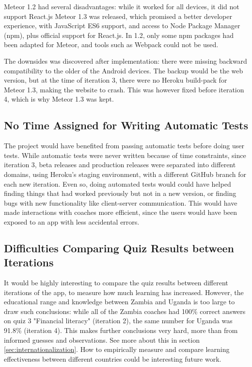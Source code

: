 Meteor 1.2 had several disadvantages: while it worked for all devices, it did not support React.js Meteor 1.3 was released, which promised a better developer experience, with JavaScript ES6 support, and access to Node Package Manager (npm), plus official support for React.js. In 1.2, only some npm packages had been adapted for Meteor, and tools such as Webpack could not be used.

The downsides was discovered after implementation: there were missing backward compatibility to the older of the Android devices. The backup would be the web version, but at the time of iteration 3, there were no Heroku build-pack for Meteor 1.3, making the website to crash. This was however fixed before iteration 4, which is why Meteor 1.3 was kept.

\subsection{No Time Assigned for Writing Automatic Tests}
The project would have benefited from passing automatic tests before doing user tests. While automatic tests were never written because of time constraints, since iteration 3, beta releases and production releases were separated into different domains, using Heroku's staging environment, with a different GitHub branch for each new iteration. Even so, doing automated tests would could have helped finding things that had worked previously but not in a new version, or finding bugs with new functionality like client-server communication. This would have made interactions with coaches more efficient, since the users would have been exposed to an app with less accidental errors.

\subsection{Difficulties Comparing Quiz Results between Iterations}
It would be highly interesting to compare the quiz results between different iterations of the app, to measure how much learning has increased. However, the educational range and knowledge between Zambia and Uganda is too large to draw such conclusions: while all of the Zambia coaches had 100\% correct answers on quiz 3 "Financial literacy" (iteration 2), the same number for Uganda was 91.8\% (iteration 4). This makes further conclusions very hard, more than from informed guesses and observations. See more about this in section \ref{sec:internationalization}. How to empirically measure and compare learning effectiveness between different countries could be interesting future work.

